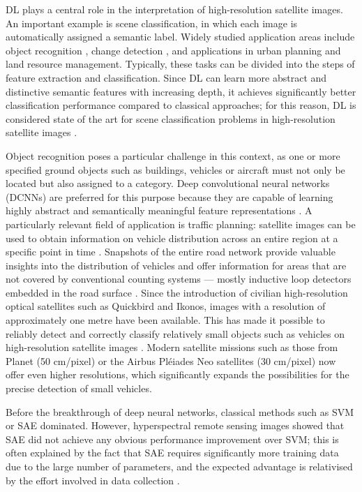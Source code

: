 \Acrlong{DL} plays a central role in the interpretation of high-resolution satellite images. An important example is scene classification, in which each image is automatically assigned a semantic label. Widely studied application areas include object recognition \cite{Bhagavathy2006,Cheng2016}, change detection \cite{Chen2006}, and applications in urban planning and land resource management. Typically, these tasks can be divided into the steps of feature extraction and classification. Since \Acrlong{DL} can learn more abstract and distinctive semantic features with increasing depth, it achieves significantly better classification performance compared to classical approaches; for this reason, \Acrlong{DL} is considered state of the art for scene classification problems in high-resolution satellite images \cite{Zhu2017}.

Object recognition poses a particular challenge in this context, as one or more specified ground objects such as buildings, vehicles or aircraft must not only be located but also assigned to a category. Deep convolutional neural networks (DCNNs) are preferred for this purpose because they are capable of learning highly abstract and semantically meaningful feature representations \cite{Zhu2017}. A particularly relevant field of application is traffic planning: satellite images can be used to obtain information on vehicle distribution across an entire region at a specific point in time \cite{Eikvil2009}. Snapshots of the entire road network provide valuable insights into the distribution of vehicles and offer information for areas that are not covered by conventional counting systems — mostly inductive loop detectors embedded in the road surface \cite{Eikvil2009}. Since the introduction of civilian high-resolution optical satellites such as Quickbird and Ikonos, images with a resolution of approximately one metre have been available. This has made it possible to reliably detect and correctly classify relatively small objects such as vehicles on high-resolution satellite images \cite{Eikvil2009}. Modern satellite missions such as those from Planet (50 cm/pixel) \cite{planet_labs} or the Airbus Pléiades Neo satellites (30 cm/pixel) \cite{airbus_neo} now offer even higher resolutions, which significantly expands the possibilities for the precise detection of small vehicles.

Before the breakthrough of deep neural networks, classical methods such as \Acrfull{SVM} or \Acrfull{SAE} dominated. However, hyperspectral remote sensing images showed that \Acrshort{SAE} did not achieve any obvious performance improvement over \Acrshort{SVM}; this is often explained by the fact that \acrshort{SAE} requires significantly more training data due to the large number of parameters, and the expected advantage is relativised by the effort involved in data collection \cite{Liu2017}.

